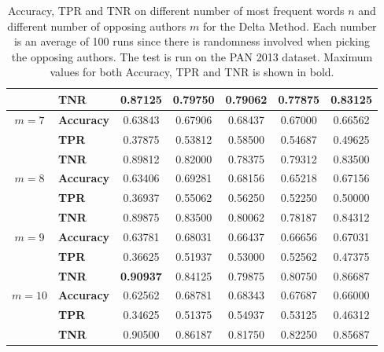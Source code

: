 \begin{table}
\begin{tabular}{c|lccccc}
               & \textbf{TNR}      & 0.87125 & 0.79750 & 0.79062 & 0.77875 & 0.83125 \\
        \hline
        $m=7$  & \textbf{Accuracy} & 0.63843 & 0.67906 & 0.68437 & 0.67000 & 0.66562 \\
               & \textbf{TPR}      & 0.37875 & 0.53812 & 0.58500 & 0.54687 & 0.49625 \\
               & \textbf{TNR}      & 0.89812 & 0.82000 & 0.78375 & 0.79312 & 0.83500 \\
        \hline
        $m=8$  & \textbf{Accuracy} & 0.63406 & 0.69281 & 0.68156 & 0.65218 & 0.67156 \\
               & \textbf{TPR}      & 0.36937 & 0.55062 & 0.56250 & 0.52250 & 0.50000 \\
               & \textbf{TNR}      & 0.89875 & 0.83500 & 0.80062 & 0.78187 & 0.84312 \\
        \hline
        $m=9$  & \textbf{Accuracy} & 0.63781 & 0.68031 & 0.66437 & 0.66656 & 0.67031 \\
               & \textbf{TPR}      & 0.36625 & 0.51937 & 0.53000 & 0.52562 & 0.47375 \\
               & \textbf{TNR}      & \textbf{0.90937} & 0.84125 & 0.79875 & 0.80750 & 0.86687 \\
        \hline
        $m=10$ & \textbf{Accuracy} & 0.62562 & 0.68781 & 0.68343 & 0.67687 & 0.66000 \\
               & \textbf{TPR}      & 0.34625 & 0.51375 & 0.54937 & 0.53125 & 0.46312 \\
               & \textbf{TNR}      & 0.90500 & 0.86187 & 0.81750 & 0.82250 & 0.85687
    \end{tabular}
    \caption{Accuracy, \gls{TPR} and \gls{TNR} on different number of most
        frequent words $n$ and different number of opposing authors $m$ for the
        Delta Method. Each number is an average of 100 runs since there is
        randomness involved when picking the opposing authors. The test is run
        on the PAN 2013 dataset. Maximum values for both Accuracy, \gls{TPR} and
        \gls{TNR} is shown in bold.}
    \label{fig:delta_pan_2013_res}
\end{table}

